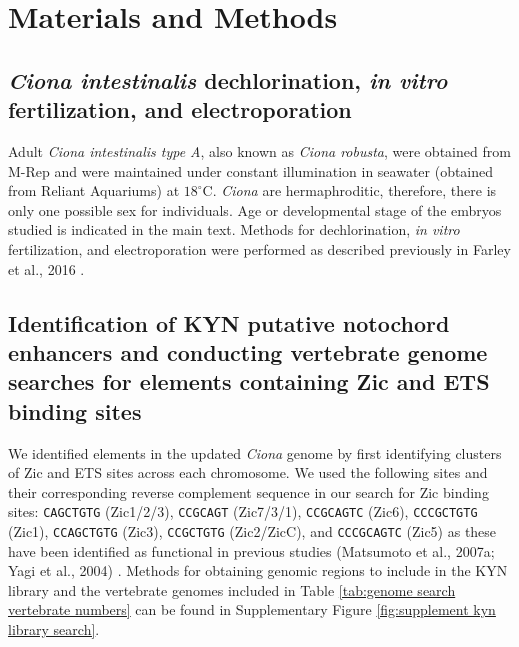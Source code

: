 \section{Materials and Methods}

\subsection{\textit{Ciona intestinalis} dechlorination, \textit{in vitro} fertilization, and electroporation}
Adult \textit{\textit{Ciona} intestinalis type A}, also known as \textit{\textit{Ciona} robusta}, were obtained from M-Rep and were maintained under constant illumination in seawater (obtained from Reliant Aquariums) at $18^\circ$C. \textit{Ciona} are hermaphroditic, therefore, there is only one possible sex for individuals. Age or developmental stage of the embryos studied is indicated in the main text. Methods for dechlorination, \textit{in vitro} fertilization, and electroporation were performed as described previously in Farley et al., 2016 \cite{farley2016}.

\subsection{Identification of KYN putative notochord enhancers and conducting vertebrate genome searches for elements containing Zic and ETS binding sites}
We identified elements in the updated \textit{Ciona} genome by first identifying clusters of Zic and ETS sites across each chromosome. We used the following sites and their corresponding reverse complement sequence in our search for Zic binding sites: \verb|CAGCTGTG| (Zic1/2/3), \verb|CCGCAGT| (Zic7/3/1), \verb|CCGCAGTC| (Zic6), \verb|CCCGCTGTG| (Zic1), \verb|CCAGCTGTG| (Zic3), \verb|CCGCTGTG| (Zic2/ZicC), and \verb|CCCGCAGTC| (Zic5) as these have been identified as functional in previous studies (Matsumoto et al., 2007a; Yagi et al., 2004) \cite{matsumoto2007a,yagi2004}. Methods for obtaining genomic regions to include in the KYN library and the vertebrate genomes included in Table \ref{tab:genome search vertebrate numbers} can be found in Supplementary Figure \ref{fig:supplement kyn library search}.

